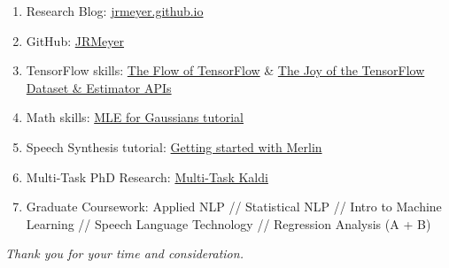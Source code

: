 \documentclass[12pt,a4paper]{article}
\begin{document}
\begin{enumerate}

\item Research Blog: \href{http://jrmeyer.github.io}{jrmeyer.github.io}

\item GitHub: \href{https://github.com/JRMeyer}{JRMeyer}
  
\item TensorFlow skills: \href{http://jrmeyer.github.io/machinelearning/2016/02/01/TensorFlow-Tutorial.html}{The Flow of TensorFlow} \& \href{http://jrmeyer.github.io/machinelearning/2019/05/29/tensorflow-dataset-estimator-api.html}{The Joy of the TensorFlow Dataset \& Estimator APIs}
  
\item Math skills: \href{http://jrmeyer.github.io/machinelearning/2017/08/18/mle.html}{MLE for Gaussians tutorial}

\item Speech Synthesis tutorial: \href{http://jrmeyer.github.io/tts/2017/02/14/Installing-Merlin.html}{Getting started with Merlin}

\item Multi-Task PhD Research: \href{https://github.com/JRMeyer/multi-task-kaldi}{Multi-Task Kaldi}
  
\item Graduate Coursework: Applied NLP // Statistical NLP // Intro to Machine Learning // Speech Language Technology // Regression Analysis (A + B)


\end{enumerate}

    
\begin{center}
\textit{Thank you for your time and consideration.}  
\end{center}
\end{document}
